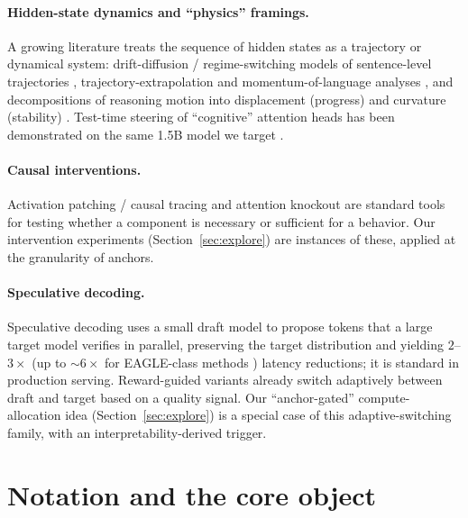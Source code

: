 \documentclass[11pt]{article}
\begin{document}
\paragraph{Hidden-state dynamics and ``physics'' framings.}
A growing literature treats the sequence of hidden states as a trajectory or dynamical system:
drift-diffusion / regime-switching models of sentence-level trajectories
\cite{statphys2025}, trajectory-extrapolation and momentum-of-language analyses
\cite{trajdyn2026}, and decompositions of reasoning motion into displacement (progress) and
curvature (stability) \cite{semstep2026}. Test-time steering of ``cognitive'' attention heads has
been demonstrated on the same 1.5B model we target \cite{steering2025}.

\paragraph{Causal interventions.}
Activation patching / causal tracing \cite{meng2022locating,wang2023interpretability} and
attention knockout \cite{rai2024how} are standard tools for testing whether a component is
necessary or sufficient for a behavior. Our intervention experiments (Section~\ref{sec:explore})
are instances of these, applied at the granularity of anchors.

\paragraph{Speculative decoding.}
Speculative decoding \cite{leviathan2023fast} uses a small draft model to propose tokens that a
large target model verifies in parallel, preserving the target distribution and yielding
$2$--$3\times$ (up to $\sim$$6\times$ for EAGLE-class methods \cite{li2024eagle}) latency
reductions; it is standard in production serving. Reward-guided variants \cite{liao2025reward}
already switch adaptively between draft and target based on a quality signal. Our
``anchor-gated'' compute-allocation idea (Section~\ref{sec:explore}) is a special case of this
adaptive-switching family, with an interpretability-derived trigger.

\section{Notation and the core object}
\end{document}
